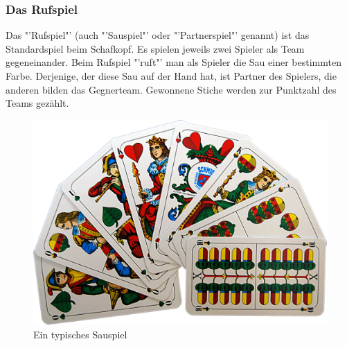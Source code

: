 \documentclass[
							a4paper, 
							11pt, 
							openany, 
							liststotoc,
							parskip=half, 
   							headings=normal
						]{scrreprt}
\begin{document}
{\cite[Kapitel 2]{merschbacher:schafkopf} 

\clearpage

\subsubsection{Das Rufspiel} \label{ssse:grundlagen_schafkopf_regeln_sauspiel} 
Das "'Rufspiel"' (auch "'Sauspiel"' oder "'Partnerspiel"' genannt) ist das Standardspiel beim Schafkopf. Es spielen jeweils zwei Spieler als Team gegeneinander. Beim Rufspiel "'ruft"' man als Spieler die Sau einer bestimmten Farbe. Derjenige, der diese Sau auf der Hand hat, ist Partner des Spielers, die anderen bilden das Gegnerteam. Gewonnene Stiche werden zur Punktzahl des Teams gezählt.

\begin{figure}[H]
\begin{center}
    \includegraphics[width=1.0\textwidth]{./pictures/cards/sauspiel.jpg}
	\caption[Schafkopf -- Ein typisches Sauspiel]{Ein typisches Sauspiel} \label{fig:schafkopf_karten_sauspiel}
\end{center}
\end{figure}

}
\end{document}
